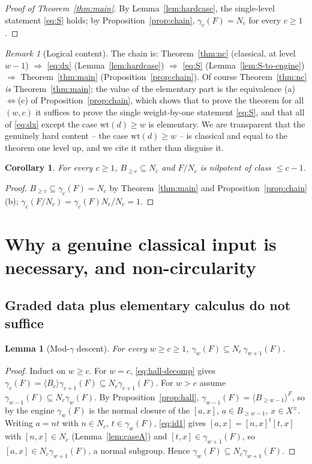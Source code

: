 \documentclass{amsart}
\newtheorem{lemma}{Lemma}
\newtheorem{corollary}{Corollary}
\theoremstyle{definition}
\theoremstyle{remark}
\newtheorem{remark}{Remark}
\begin{document}
\begin{proof}[Proof of Theorem~\ref{thm:main}]
By Lemma~\ref{lem:hardcase}, the single-level statement \eqref{eq:S} holds; by
Proposition~\ref{prop:chain}, $\gamma_c(F)=N_c$ for every $c\ge1$.
\end{proof}

\begin{remark}[Logical content]
The chain is: Theorem~\ref{thm:nc} (classical, at level $w-1$) $\Rightarrow$
\eqref{eq:dx} (Lemma~\ref{lem:hardcase}) $\Rightarrow$ \eqref{eq:S}
(Lemma~\ref{lem:S-to-engine}) $\Rightarrow$ Theorem~\ref{thm:main}
(Proposition~\ref{prop:chain}). Of course Theorem~\ref{thm:nc} \emph{is}
Theorem~\ref{thm:main}; the value of the elementary part is the equivalence
\textup{(a)}$\Leftrightarrow$\textup{(c)} of Proposition~\ref{prop:chain}, which
shows that to prove the theorem for all $(w,c)$ it suffices to prove the single
weight-by-one statement \eqref{eq:S}, and that all of \eqref{eq:dx} except the case
$\mathrm{wt}(d)\ge w$ is elementary. We are transparent that the genuinely hard
content -- the case $\mathrm{wt}(d)\ge w$ -- is classical and equal to the theorem
one level up, and we cite it rather than disguise it.
\end{remark}

\begin{corollary}
For every $c\ge1$, $B_{\ge c}\subseteq N_c$ and $F/N_c$ is nilpotent of class
$\le c-1$.
\end{corollary}
\begin{proof}
$B_{\ge c}\subseteq\gamma_c(F)=N_c$ by Theorem~\ref{thm:main} and
Proposition~\ref{prop:chain}(b); $\gamma_c(F/N_c)=\gamma_c(F)N_c/N_c=1$.
\end{proof}

\section{Why a genuine classical input is necessary, and non-circularity}
\label{sec:why}

\subsection{Graded data plus elementary calculus do not suffice}

\begin{lemma}[Mod-$\gamma$ descent]\label{lem:moddescent}
For every $w\ge c\ge1$, $\gamma_w(F)\subseteq N_c\,\gamma_{w+1}(F)$.
\end{lemma}
\begin{proof}
Induct on $w\ge c$. For $w=c$, \eqref{eq:hall-decomp} gives
$\gamma_c(F)=\langle B_c\rangle\gamma_{c+1}(F)\subseteq N_c\gamma_{c+1}(F)$. For
$w>c$ assume $\gamma_{w-1}(F)\subseteq N_c\gamma_w(F)$. By
Proposition~\ref{prop:hall}, $\gamma_{w-1}(F)=\langle B_{\ge w-1}\rangle^F$, so by
the engine $\gamma_w(F)$ is the normal closure of the $[a,x]$, $a\in B_{\ge w-1}$,
$x\in X^{\pm}$. Writing $a=nt$ with $n\in N_c$, $t\in\gamma_w(F)$, \eqref{eq:id1}
gives $[a,x]=[n,x]^t[t,x]$ with $[n,x]\in N_c$ (Lemma~\ref{lem:caseA}) and
$[t,x]\in\gamma_{w+1}(F)$, so $[a,x]\in N_c\gamma_{w+1}(F)$, a normal subgroup.
Hence $\gamma_w(F)\subseteq N_c\gamma_{w+1}(F)$.
\end{proof}
\end{document}
